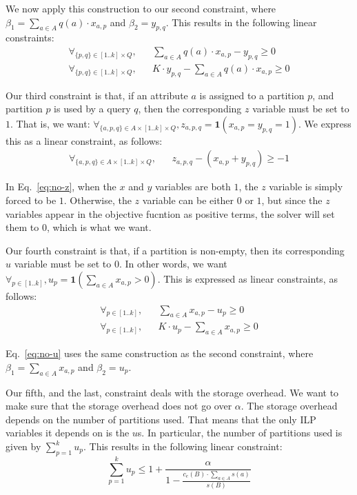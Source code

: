We now apply this construction to our second constraint, where
$\beta_1=\sum_{a\in A} q(a)\cdot x_{a,p}$ and $\beta_2=y_{p,q}$. This results
in the following linear constraints:
\begin{eqnarray}
\forall_{\{p,q\}\in [1..k]\times Q}, 
    &&  \sum_{a\in A} q(a)\cdot x_{a,p} - y_{p,q} \geq 0 \nonumber\\
\forall_{\{p,q\}\in [1..k]\times Q}, 
    &&  K\cdot y_{p,q} - \sum_{a\in A} q(a)\cdot x_{a,p}  \geq 0 
\end{eqnarray}

Our third constraint is that, if an attribute $a$ is assigned to a partition
$p$, and partition $p$ is used by a query $q$, then the corresponding $z$
variable must be set to $1$. That is, we want: $\forall_{\{a,p,q\}\in A\times
[1..k]\times Q}, z_{a,p,q}=\mathbf{1}(x_{a,p} = y_{p,q} = 1)$. We express this
as a linear  constraint, as follows:
\begin{eqnarray}
\forall_{\{a,p,q\}\in A\times [1..k]\times Q},
    && z_{a,p,q} - (x_{a,p} + y_{p,q}) \geq -1\label{eq:no-z}
\end{eqnarray}

In Eq.~\ref{eq:no-z}, when the $x$ and $y$ variables are both $1$, the  $z$
variable is simply forced to be $1$. Otherwise, the $z$ variable can be either
$0$ or $1$, but since the $z$ variables appear in the objective fucntion as
positive terms, the solver will set them to $0$, which is what we want. 

Our fourth constraint is that, if a partition is non-empty, then its
corresponding $u$ variable must be set to $0$. In other words,  we want
$\forall_{p\in[1..k]}, u_p = \mathbf{1}(\sum_{a\in A} x_{a,p}>0)$. This is
expressed as linear constraints, as follows:
\begin{eqnarray}
\forall_{p\in[1..k]},
    && \sum_{a\in A} x_{a,p} - u_p \geq 0 \nonumber\\
\forall_{p\in[1..k]},
    && K\cdot u_p - \sum_{a\in A} x_{a,p} \geq 0 \label{eq:no-u}
\end{eqnarray}

Eq.~\ref{eq:no-u} uses the same construction as the second constraint, where
$\beta_1=\sum_{a\in A} x_{a,p}$ and $\beta_2=u_p$.

Our fifth, and the last, constraint deals with the storage overhead. We want to
 make sure that the storage overhead does not go over $\alpha$. The storage
overhead depends on the number of partitions used. That means that the only 
ILP variables it depends on is the $u$s. In particular, the number of
partitions used is given by $\sum_{p=1}^{k} u_p$. This results in the
following linear constraint:
\begin{equation}
\sum_{p=1}^{k} u_p \leq 1 + \frac{\alpha}
  {1-\frac{c_e(B)\cdot \sum_{a\in A} s(a)}{s(B)}}
\end{equation}

